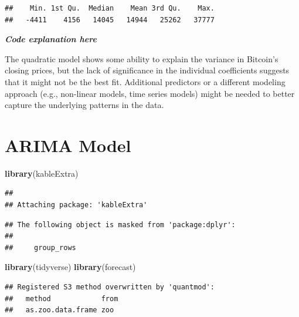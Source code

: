 \documentclass[
]{book}
\newenvironment{Shaded}{\begin{snugshade}}{\end{snugshade}}
\newcommand{\FunctionTok}[1]{\textcolor[rgb]{0.13,0.29,0.53}{\textbf{#1}}}
\newcommand{\NormalTok}[1]{#1}
\newcommand{\SpecialCharTok}[1]{\textcolor[rgb]{0.81,0.36,0.00}{\textbf{#1}}}
\begin{document}
\begin{Shaded}
\end{Shaded}

\begin{verbatim}
##    Min. 1st Qu.  Median    Mean 3rd Qu.    Max. 
##   -4411    4156   14045   14944   25262   37777
\end{verbatim}

\emph{\textbf{Code explanation here}}

The quadratic model shows some ability to explain the variance in Bitcoin's closing prices, but the lack of significance in the individual coefficients suggests that it might not be the best fit. Additional predictors or a different modeling approach (e.g., non-linear models, time series models) might be needed to better capture the underlying patterns in the data.

\chapter{ARIMA Model}\label{arima-model}

\begin{Shaded}
\begin{Highlighting}[]
\FunctionTok{library}\NormalTok{(kableExtra)}
\end{Highlighting}
\end{Shaded}

\begin{verbatim}
## 
## Attaching package: 'kableExtra'
\end{verbatim}

\begin{verbatim}
## The following object is masked from 'package:dplyr':
## 
##     group_rows
\end{verbatim}

\begin{Shaded}
\begin{Highlighting}[]
\FunctionTok{library}\NormalTok{(tidyverse)}
\FunctionTok{library}\NormalTok{(forecast)}
\end{Highlighting}
\end{Shaded}

\begin{verbatim}
## Registered S3 method overwritten by 'quantmod':
##   method            from
##   as.zoo.data.frame zoo
\end{verbatim}
\end{document}
